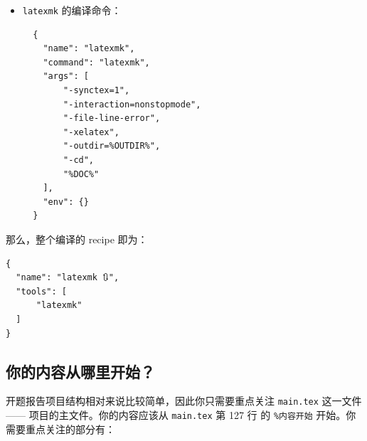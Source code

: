 \begin{itemize}
  \item \texttt{latexmk} 的编译命令：
  \begin{verbatim}
  {
    "name": "latexmk",
    "command": "latexmk",
    "args": [
        "-synctex=1",
        "-interaction=nonstopmode",
        "-file-line-error",
        "-xelatex",
        "-outdir=%OUTDIR%",
        "-cd",
        "%DOC%"
    ],
    "env": {}
  }
  \end{verbatim}
\end{itemize}

那么，整个编译的 recipe 即为：
\begin{verbatim}
{
  "name": "latexmk 🔃",
  "tools": [
      "latexmk"
  ]
}
\end{verbatim}

\subsection{你的内容从哪里开始？}
开题报告项目结构相对来说比较简单，因此你只需要重点关注 \texttt{main.tex} 这一文件 —— 项目的主文件。你的内容应该从 \texttt{main.tex} 第 127 行 的 \texttt{\%内容开始} 开始。你需要重点关注的部分有：

\begin{table}[H]
\centering
\caption{开题报告内容概要}
\label{tab:proposalreport}
\end{table}


